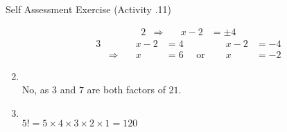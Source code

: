 \documentclass[../notes.tex]{subfiles}
\begin{document}
\begin{exercise}{Self Assessment Exercise (Activity \thechapter.11)}
\begin{enumerate}
\begin{alignat*}{2}
							& \Rightarrow \quad & x - 2 &= \pm 4
						\end{alignat*}
						\begin{alignat*}{3}
							& \qquad &x - 2 &= 4 \qquad &x - 2 &= -4\\
							& \Rightarrow \quad &x &= 6 \quad \text{ or } \quad &x &= -2 
						\end{alignat*}
					\item {}\\
						No, as $3$ and $7$ are both factors of $21$.
					\item {}\\
						$5! = 5 \times 4 \times 3 \times 2 \times 1 = 120$
				\end{enumerate}
			\end{exercise}
\end{document}
